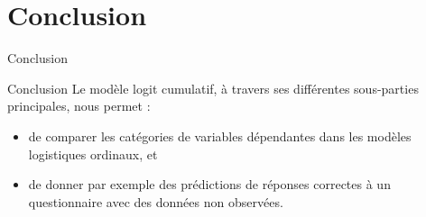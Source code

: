 \documentclass[11pt]{beamer}
\begin{document}
	\section{Conclusion}
	
	\begin{frame}{Conclusion}
		
		\begin{block}{Conclusion}
			Le modèle logit cumulatif, à travers ses différentes sous-parties principales, nous permet :
			\begin{itemize}
				\item de comparer les catégories de variables dépendantes dans les modèles logistiques ordinaux, et
				\item de donner par exemple des prédictions de réponses correctes à un questionnaire avec des données non observées.
			\end{itemize}
			
		\end{block}
	\end{frame}
	
	
\end{document}

